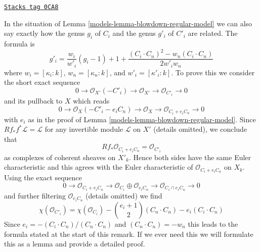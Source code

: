 \begin{remark}
\label{models-remark-genus-change}
\href{https://stacks.math.columbia.edu/tag/0CA8}{\texttt{Stacks tag 0CA8}}

In the situation of Lemma \ref{models-lemma-blowdown-regular-model}
we can also say exactly how the genus $g_i$ of $C_i$ and the genus
$g'_i$ of $C'_i$ are related. The formula is
$$
g'_i = \frac{w_i}{w'_i}(g_i - 1) + 1 +
\frac{(C_i \cdot C_n)^2 - w_n(C_i \cdot C_n)}{2w'_iw_n}
$$
where $w_i = [\kappa_i : k]$, $w_n = [\kappa_n : k]$, and
$w'_i = [\kappa'_i : k]$.
To prove this we consider the short exact sequence
$$
0 \to \mathcal{O}_{X'}(-C'_i) \to \mathcal{O}_{X'} \to
\mathcal{O}_{C'_i} \to 0
$$
and its pullback to $X$ which reads
$$
0 \to \mathcal{O}_X(-C'_i - e_iC_n) \to \mathcal{O}_X \to
\mathcal{O}_{C_i + e_i C_n} \to 0
$$
with $e_i$ as in the proof of Lemma \ref{models-lemma-blowdown-regular-model}.
Since $Rf_*f^*\mathcal{L} = \mathcal{L}$ for any invertible module
$\mathcal{L}$ on $X'$ (details omitted), we conclude that
$$
Rf_*\mathcal{O}_{C_i + e_i C_n} = \mathcal{O}_{C'_i}
$$
as complexes of coherent sheaves on $X'_k$.
Hence both sides have the same Euler characteristic and this
agrees with the Euler characteristic of $\mathcal{O}_{C_i + e_i C_n}$
on $X_k$. Using the exact sequence
$$
0 \to \mathcal{O}_{C_i + e_i C_n} \to
\mathcal{O}_{C_i} \oplus \mathcal{O}_{e_iC_n} \to
\mathcal{O}_{C_i \cap e_iC_n} \to 0
$$
and further filtering $\mathcal{O}_{e_iC_n}$ (details omitted) we find
$$
\chi(\mathcal{O}_{C'_i}) =
\chi(\mathcal{O}_{C_i}) - {e_i + 1 \choose 2}(C_n \cdot C_n)
- e_i(C_i \cdot C_n)
$$
Since $e_i = -(C_i \cdot C_n)/(C_n \cdot C_n)$ and
$(C_n \cdot C_n) = -w_n$ this leads to the formula
stated at the start of this remark. If we ever need
this we will formulate this as a lemma and
provide a detailed proof.
\end{remark}

